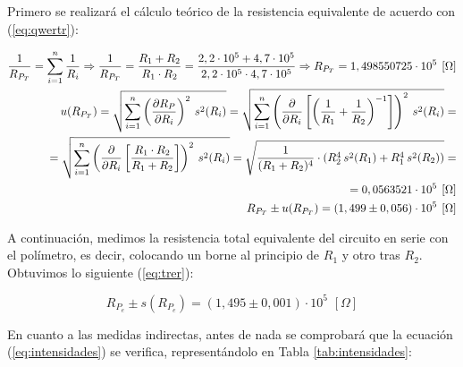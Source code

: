 \documentclass[11pt]{report}
\begin{document}
\begin{refsection}
Primero se realizará el cálculo teórico de la resistencia equivalente de acuerdo con (\ref{eq:qwertr}):
\begin{center}
\begin{equation}
\begin{split}
    \frac{1}{R_{P_T}}=\sum^n_{i=1} \frac{1}{R_i}  \Rightarrow \frac{1}{R_{P_T}} = \frac{R_1 + R_2}{R_1 \cdot R_2} = \frac{2,2 \cdot 10^5 + 4,7 \cdot 10^5}
    {2,2 \cdot 10^5 \cdot 4,7 \cdot 10^5} \Rightarrow R_{P_T}= 1,498550725 \cdot 10^5 \hspace{4pt}[\Omega] \\
    \medskip
    u(R_{P_T})=\sqrt{\sum^n_{i=1} \left( \frac{\partial R_P}{\partial R_i} \right)^2\hspace{2 pt} s^2(R_i)}
    =\sqrt{\sum^n_{i=1} \left( \frac{\partial}{\partial R_i}\left[\left(\frac{1}{R_1}+\frac{1}{R_2}\right)^{-1}\right] \right)^2\hspace{2 pt}
    s^2(R_i)}=\\ 
    \medskip
    =\sqrt{\sum^n_{i=1} \left( \frac{\partial}{\partial R_i}\left[\frac{R_1 \cdot R_2}{R_1+R_2}\right] \right)^2\hspace{2 pt} s^2(R_i)}=%
    \sqrt{\frac{1}{(R_1+R_2)^4} \cdot \left(R_2^4 \hspace{2 pt}s^2(R_1) + R_1^4 \hspace{2 pt}s^2(R_2)\right)}=\\
    =0,0563521 \cdot 10^5 \hspace{4pt}[\Omega] \\
    \bigskip
    R_{P_T} \pm u(R_{P_T})=(1,499 \pm 0,056)\cdot 10^5 \hspace{4pt}[\Omega]
    \label{eq:qwertr}
\end{split}
\end{equation}
\end{center}

A continuación, medimos la resistencia total equivalente del circuito en serie con el polímetro, es decir, colocando un borne
al principio de $R_1$ y otro tras $R_2$. Obtuvimos lo siguiente (\ref{eq:trer}):

\begin{equation}
    R_{P_e} \pm s(R_{P_e}) = (1,495 \pm 0,001) \cdot 10^5 \hspace{4pt} [\Omega]
    \label{eq:trer}
\end{equation}

En cuanto a las medidas indirectas, antes de nada se comprobará que la ecuación (\ref{eq:intensidades}) se verifica, representándolo
en Tabla \ref{tab:intensidades}:


\end{refsection}
\end{document}
